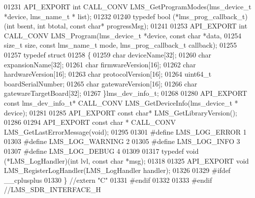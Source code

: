 \begin{DoxyCode}
01231 API_EXPORT \textcolor{keywordtype}{int} CALL_CONV LMS_GetProgramModes(lms\_device\_t *device, lms\_name\_t *
      list);
01232 
01240 \textcolor{keyword}{typedef} bool (*lms_prog_callback_t)(\textcolor{keywordtype}{int} bsent, \textcolor{keywordtype}{int} btotal, \textcolor{keyword}{const} \textcolor{keywordtype}{char}* progressMsg);
01241 
01253 API_EXPORT \textcolor{keywordtype}{int} CALL_CONV LMS_Program(lms\_device\_t *device, \textcolor{keyword}{const} \textcolor{keywordtype}{char} *data, 
01254                 \textcolor{keywordtype}{size\_t} size, \textcolor{keyword}{const} lms\_name\_t mode, lms_prog_callback_t callback);
01255 
01257 \textcolor{keyword}{typedef} \textcolor{keyword}{struct}
01258 \{
01259     \textcolor{keywordtype}{char} deviceName[32];            
01260     \textcolor{keywordtype}{char} expansionName[32];         
01261     \textcolor{keywordtype}{char} firmwareVersion[16];       
01262     \textcolor{keywordtype}{char} hardwareVersion[16];       
01263     \textcolor{keywordtype}{char} protocolVersion[16];       
01264     uint64\_t boardSerialNumber;     
01265     \textcolor{keywordtype}{char} gatewareVersion[16];       
01266     \textcolor{keywordtype}{char} gatewareTargetBoard[32];   
01267 \}lms_dev_info_t;
01268 
01280 API_EXPORT \textcolor{keyword}{const} lms_dev_info_t* CALL_CONV LMS_GetDeviceInfo(lms\_device\_t *
      device);
01281 
01285 API_EXPORT \textcolor{keyword}{const} \textcolor{keywordtype}{char}* LMS_GetLibraryVersion();
01286 
01294 API_EXPORT \textcolor{keyword}{const} \textcolor{keywordtype}{char} * CALL_CONV LMS_GetLastErrorMessage(\textcolor{keywordtype}{void});
01295 
01301 \textcolor{preprocessor}{#define LMS\_LOG\_ERROR    1  }
01303 \textcolor{preprocessor}{#define LMS\_LOG\_WARNING  2  }
01305 \textcolor{preprocessor}{#define LMS\_LOG\_INFO     3  }
01307 \textcolor{preprocessor}{#define LMS\_LOG\_DEBUG    4 }
01309 
01317  \textcolor{keyword}{typedef} void (*LMS_LogHandler)(\textcolor{keywordtype}{int} lvl, \textcolor{keyword}{const} \textcolor{keywordtype}{char} *msg);
01318  
01325 API_EXPORT \textcolor{keywordtype}{void} LMS_RegisterLogHandler(LMS_LogHandler handler);
01326 
01329 \textcolor{preprocessor}{#ifdef \_\_cplusplus}
01330 \} \textcolor{comment}{//extern "C"}
01331 \textcolor{preprocessor}{#endif}
01332 
01333 \textcolor{preprocessor}{#endif //LMS\_SDR\_INTERFACE\_H}
\end{DoxyCode}
